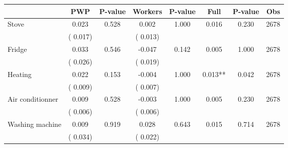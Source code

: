 
\begin{tabular}{l*{7}{c}}\hline&\multicolumn{1}{c}{PWP}&\multicolumn{1}{c}{P-value}&\multicolumn{1}{c}{Workers}&\multicolumn{1}{c}{P-value}&\multicolumn{1}{c}{Full}&\multicolumn{1}{c}{P-value}&\multicolumn{1}{c}{Obs} \\ \hline

 Stove       &              0.023       &        0.528  &              0.002       &        1.000  &              0.016       &              0.230 &  2678 \\ 
                       &       (       0.017)             &                               &       (       0.013)                     &                               &                                               &                                &                      \\ 

 Fridge       &              0.033       &        0.546  &             -0.047       &        0.142  &              0.005       &              1.000 &  2678 \\ 
                       &       (       0.026)             &                               &       (       0.019)                     &                               &                                               &                                &                      \\ 

 Heating       &              0.022       &        0.153  &             -0.004       &        1.000  &              0.013**       &              0.042 &  2678 \\ 
                       &       (       0.009)             &                               &       (       0.007)                     &                               &                                               &                                &                      \\ 

 Air conditionner       &              0.009       &        0.528  &             -0.003       &        1.000  &              0.005       &              0.230 &  2678 \\ 
                       &       (       0.006)             &                               &       (       0.006)                     &                               &                                               &                                &                      \\ 

 Washing machine       &              0.009       &        0.919  &              0.028       &        0.643  &              0.015       &              0.714 &  2678 \\ 
                       &       (       0.034)             &                               &       (       0.022)                     &                               &                                               &                                &                      \\ 


\end{tabular}
